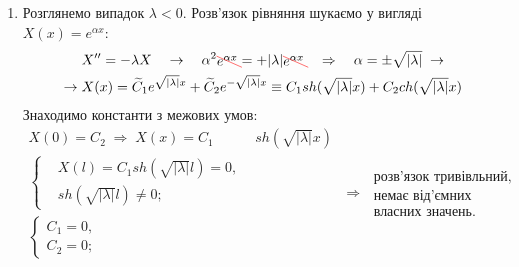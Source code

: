 \documentclass[a4paper, 14pt]{extreport}
\begin{document}
\begin{enumerate}
\begin{enumerate}
        \item Розглянемо випадок $\lambda < 0$. Розв'язок рівняння шукаємо у вигляді $X(x) = e^{\alpha x}$: 
        \begin{equation*}
            \begin{aligned}
                &X^{\prime\prime} = -\lambda X
                \quad\to\quad
                \alpha^2 \textcolor{red}{\begin{xy}*{\textcolor{black}{e^{\alpha x}}};p+LU;+RD**h@{}+/\jot/**h@{-}\end{xy}} = +|\lambda| \textcolor{red}{\begin{xy}*{\textcolor{black}{e^{\alpha x}}};p+LU;+RD**h@{}+/\jot/**h@{-}\end{xy}}
                \quad\Rightarrow\quad
                \alpha = \pm \sqrt{|\lambda|}
                \;\to\\
                \to\;
                &X(x) = \widetilde{C}_1 e^{\sqrt{|\lambda|}x} + \widetilde{C}_2 e^{-\sqrt{|\lambda|}x} \equiv C_1 sh(\sqrt{|\lambda|}x) + C_2 ch({\sqrt{|\lambda|}x})
            \end{aligned}
        \end{equation*}
        Знаходимо константи з межових умов:
        \begin{equation*}
            \begin{aligned}
                X(0) = C_2
                \;\Rightarrow\;
                X(x) = C_1 &sh(\sqrt{|\lambda|}x)\\
                \left\{ \begin{aligned}
                    &X(l) = C_1 sh(\sqrt{|\lambda|}l) = 0, \\
                    &sh(\sqrt{|\lambda|}l) \neq 0;
                \end{aligned} \right.&\\
                \left\{ \begin{aligned}
                    C_1 = 0, \\ 
                    C_2 = 0;
                \end{aligned} \right. \qquad\qquad\qquad\qquad&
            \end{aligned}
            \;\Rightarrow\;
            \begin{aligned}
                \text{розв'язок тривівльний,}\\
                \text{немає від'ємних}\\
                \text{власних значень.}
            \end{aligned}
        \end{equation*}


\end{enumerate}
\end{enumerate}
\end{document}
